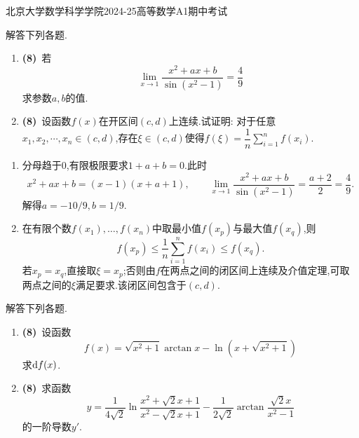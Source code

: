 \documentclass{ctexart}
\begin{document}
\pagestyle{empty}
\begin{center}\Large
    北京大学数学科学学院2024-25高等数学A1期中考试
\end{center}
\begin{problem}[1.(16\songti{分})]
    解答下列各题.
    \begin{enumerate}[label=\textbf{(\arabic*)}]
        \item \textbf{(8)}\ 若$$\lim_{x\to1}\dfrac{x^2+ax+b}{\sin\left(x^2-1\right)}=\dfrac{4}{9}$$求参数$a,b$的值.
        \item \textbf{(8)}\ 设函数$f(x)$在开区间$(c,d)$上连续.试证明:
            对于任意$x_1,x_2,\cdots,x_n\in(c,d)$,存在$\xi\in(c,d)$使得$\displaystyle f(\xi)=\dfrac{1}{n}\sum_{i=1}^{n}f(x_i)$.
    \end{enumerate}
\end{problem}
\begin{solution}
\begin{enumerate}[label=\textbf{(\arabic*)}]
        \item 分母趋于$0$,有限极限要求$1+a+b=0$.此时
            \[x^2+ax+b=(x-1)(x+a+1),\qquad
            \lim_{x\to1}\dfrac{x^2+ax+b}{\sin(x^2-1)}=\dfrac{a+2}{2}=\dfrac49.\]
            解得$a=-10/9,b=1/9$.
        \item 在有限个数$f(x_1),\ldots,f(x_n)$中取最小值$f(x_p)$与最大值$f(x_q)$,则
            \[f(x_p)\leqslant\dfrac1n\sum_{i=1}^nf(x_i)\leqslant f(x_q).\]
            若$x_p=x_q$,直接取$\xi=x_p$;否则由$f$在两点之间的闭区间上连续及介值定理,可取两点之间的$\xi$满足要求.该闭区间包含于$(c,d)$.
    \end{enumerate}
\end{solution}
\begin{problem}[2.(16\songti{分})]
    解答下列各题.
    \begin{enumerate}[label=\textbf{(\arabic*)}]
        \item \textbf{(8)}\ 设函数$$f(x)=\sqrt{x^2+1}\arctan x-\ln\left(x+\sqrt{x^2+1}\right)$$求$\mathrm{d} f(x)$.
        \item \textbf{(8)}\ 求函数$$y=\dfrac{1}{4\sqrt{2}}\ln\dfrac{x^2+\sqrt{2}x+1}{x^2-\sqrt{2}x+1}-\dfrac{1}{2\sqrt{2}}\arctan\dfrac{\sqrt{2}x}{x^2-1}$$的一阶导数$y'$.
    \end{enumerate}
\end{problem}
\end{document}
